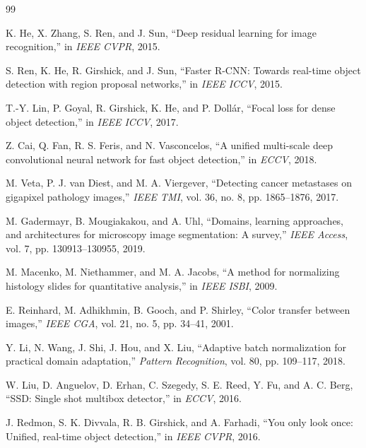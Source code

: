 \documentclass[11pt,a4paper]{article}
\begin{document}
\begin{thebibliography}{99}

K. He, X. Zhang, S. Ren, and J. Sun, ``Deep residual learning for image recognition,'' 
in \textit{IEEE CVPR}, 2015.

S. Ren, K. He, R. Girshick, and J. Sun, ``Faster R-CNN: Towards real-time object 
detection with region proposal networks,'' in \textit{IEEE ICCV}, 2015.

T.-Y. Lin, P. Goyal, R. Girshick, K. He, and P. Dollár, ``Focal loss for dense 
object detection,'' in \textit{IEEE ICCV}, 2017.

Z. Cai, Q. Fan, R. S. Feris, and N. Vasconcelos, ``A unified multi-scale deep 
convolutional neural network for fast object detection,'' in \textit{ECCV}, 2018.

M. Veta, P. J. van Diest, and M. A. Viergever, ``Detecting cancer metastases on 
gigapixel pathology images,'' \textit{IEEE TMI}, vol. 36, no. 8, pp. 1865--1876, 2017.

M. Gadermayr, B. Mougiakakou, and A. Uhl, ``Domains, learning approaches, and 
architectures for microscopy image segmentation: A survey,'' \textit{IEEE Access}, 
vol. 7, pp. 130913--130955, 2019.

M. Macenko, M. Niethammer, and M. A. Jacobs, ``A method for normalizing histology 
slides for quantitative analysis,'' in \textit{IEEE ISBI}, 2009.

E. Reinhard, M. Adhikhmin, B. Gooch, and P. Shirley, ``Color transfer between images,'' 
\textit{IEEE CGA}, vol. 21, no. 5, pp. 34--41, 2001.

Y. Li, N. Wang, J. Shi, J. Hou, and X. Liu, ``Adaptive batch normalization for 
practical domain adaptation,'' \textit{Pattern Recognition}, vol. 80, pp. 109--117, 2018.

W. Liu, D. Anguelov, D. Erhan, C. Szegedy, S. E. Reed, Y. Fu, and A. C. Berg, 
``SSD: Single shot multibox detector,'' in \textit{ECCV}, 2016.

J. Redmon, S. K. Divvala, R. B. Girshick, and A. Farhadi, ``You only look once: 
Unified, real-time object detection,'' in \textit{IEEE CVPR}, 2016.

\end{thebibliography}
\end{document}
